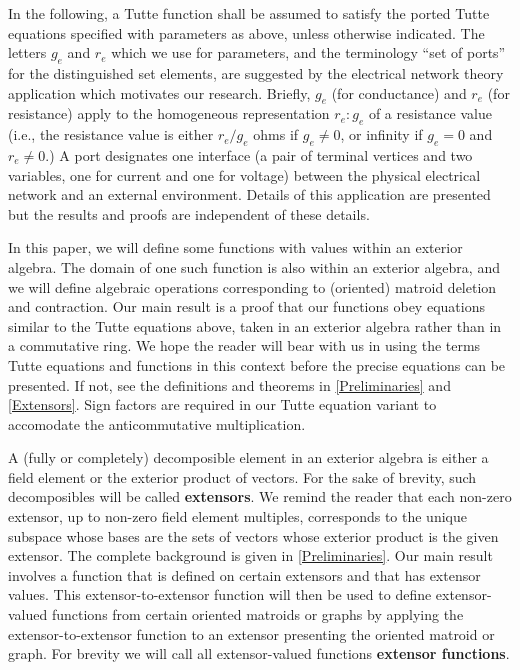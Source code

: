 \documentclass[12pt]{article}
\theoremstyle{definition}
\begin{document}
In the following, a Tutte function shall be assumed to satisfy 
the ported Tutte equations specified with parameters as above, unless
otherwise indicated.
The letters
$g_e$ and $r_e$ which we use for parameters, and the terminology
``set of ports'' for the distinguished set elements,
are suggested by the electrical network theory 
application which motivates our research.  Briefly, $g_e$ (for conductance)
and $r_e$ (for resistance) apply to the homogeneous 
representation $r_e:g_e$ of a resistance value 
(i.e., the resistance value
is either $r_e/g_e$ ohms if $g_e\neq 0$, or infinity if $g_e=0$ and 
$r_e\neq 0$.)
A port
designates one interface (a pair of terminal vertices and two variables, 
one for current and one for voltage) between the physical electrical network
and an external environment.  Details of this application are presented
but the results and proofs are independent of these details.

In this paper, we will define some functions with values within
an exterior algebra.  The domain of one such function is also
within an exterior algebra, and we will define algebraic 
operations corresponding to (oriented) matroid deletion and contraction.  
Our main result
is a proof that our functions obey equations similar to the 
Tutte equations above, taken in an exterior algebra rather than in
a commutative ring.  We hope the reader will bear with us in
using the terms Tutte equations and functions in this context 
before the precise equations can be presented.
If not, see the definitions and theorems in \textsection \ref{Preliminaries} 
and \textsection \ref{Extensors}.
Sign factors are required in our Tutte equation variant
to accomodate the anticommutative multiplication.

A (fully or completely) decomposible element in an exterior algebra is
either a field element or the exterior product of vectors.  For the sake of
brevity, such decomposibles will be called \textbf{extensors}.
We remind the reader that each non-zero extensor, up to non-zero field element multiples,
corresponds to the unique subspace whose bases are the sets of vectors whose
exterior product is the given extensor.  The complete background is 
given in \textsection \ref{Preliminaries}.
Our main result involves a function that is defined on certain extensors and that has
extensor values.  This extensor-to-extensor 
function will then be used to define extensor-valued functions from
certain oriented matroids or graphs by applying the extensor-to-extensor
function to an extensor presenting the oriented matroid or graph.
For brevity we will call all extensor-valued functions \textbf{extensor functions}.
\end{document}
